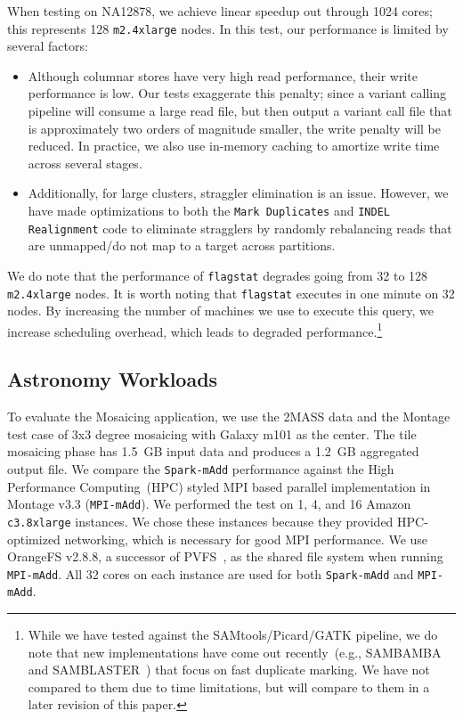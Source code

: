 \documentclass{acm_proc_article-sp}
\begin{document}
When testing on NA12878, we achieve linear speedup out through 1024 cores; this represents 128
\texttt{m2.4xlarge} nodes. In this test, our performance is limited by several factors:

\begin{itemize}
\item Although columnar stores have very high read performance, their write performance is low. Our
tests exaggerate this penalty; since a variant calling pipeline will consume a large read file, but then output a
variant call file that is approximately two orders of magnitude smaller, the write penalty will be reduced. In
practice, we also use in-memory caching to amortize write time across several stages.
\item Additionally, for large clusters, straggler elimination is an issue. However, we have made optimizations to
both the \texttt{Mark Duplicates} and \texttt{INDEL Realignment} code to eliminate stragglers by randomly
rebalancing reads that are unmapped/do not map to a target across partitions.
\end{itemize}

We do note that the performance of \texttt{flagstat} degrades going from 32 to 128 \texttt{m2.4xlarge} nodes.
It is worth noting that \texttt{flagstat} executes in one minute on 32 nodes. By increasing the number of machines
we use to execute this query, we increase scheduling overhead, which leads to degraded
performance.\footnote{While we
have tested against the SAMtools/Picard/GATK pipeline, we do note that new implementations have come out
recently~(e.g., SAMBAMBA and SAMBLASTER~\cite{faust14}) that focus on fast duplicate marking. We have not
compared to them due to time limitations, but will compare to them in a later revision of this paper.}

\subsection{Astronomy Workloads}
\label{sec:astro-workloads}

To evaluate the Mosaicing application, we use the 2MASS data and the Montage test case of 3x3 degree
mosaicing with Galaxy m101 as the center. The tile mosaicing phase has 1.5~GB input data and produces a
1.2~GB aggregated output file. We compare the \texttt{Spark-mAdd} performance against the High Performance
Computing~(HPC) styled MPI based parallel implementation in Montage v3.3 (\texttt{MPI-mAdd}). We performed
the test on 1, 4, and 16 Amazon \texttt{c3.8xlarge} instances. We chose these instances because they provided
HPC-optimized networking, which is necessary for good MPI performance. We use OrangeFS
v2.8.8, a successor of \linebreak PVFS~\cite{PVFS}, as the shared file system when running \texttt{MPI-mAdd}. All
32 cores on each instance are used for both \texttt{Spark-mAdd} and \texttt{MPI-mAdd}.
\end{document}
